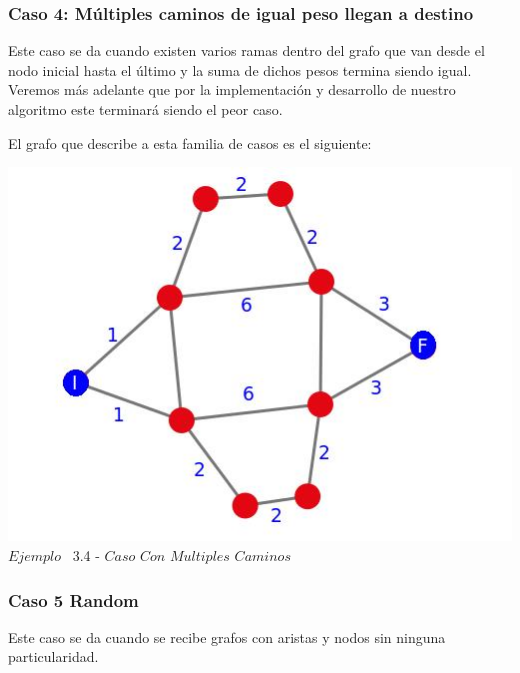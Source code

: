 \begin{center}
 \subsubsection*{Caso 4: Múltiples caminos de igual peso llegan a destino}
\end{center}
  
Este caso se da cuando existen varios ramas dentro del grafo que van desde el nodo inicial hasta el \'ultimo y la suma de dichos pesos termina siendo igual. Veremos m\'as adelante que por la implementaci\'on y desarrollo de nuestro algoritmo este terminar\'a siendo el peor caso.


El grafo que describe a esta familia de casos es el siguiente:\\

\vspace*{0.3cm} \vspace*{0.3cm}
  \begin{center}
 \includegraphics[scale=0.5]{./EJ3/grafoMultiCamino.jpeg}
 \\{$Ejemplo$ \ 3.4 - $Caso$ $Con$ $Multiples$ $Caminos$}
  \end{center}
  \vspace*{0.3cm}
  
\begin{center}
 \subsubsection*{Caso 5 Random}
\end{center}

Este caso se da cuando se recibe grafos con aristas y nodos sin ninguna particularidad.

